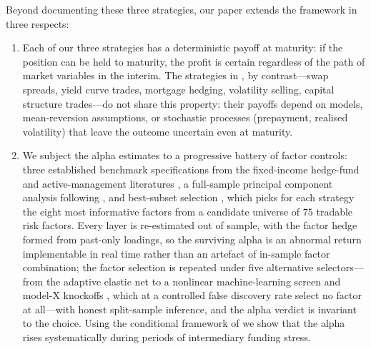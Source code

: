 Beyond documenting these three strategies, our paper extends the
\citet{duarte2007risk} framework in three
respects:
\begin{enumerate}[label=\textbf{\arabic*.}, leftmargin=*, itemsep=4pt]

\item Each of our three strategies has a deterministic payoff at
  maturity: if the position can be held to maturity, the profit is
  certain regardless of the path of market variables in the interim.
  The strategies in \citet{duarte2007risk}, by contrast---swap
  spreads, yield curve trades, mortgage hedging, volatility selling,
  capital structure trades---do not share this property: their
  payoffs depend on models, mean-reversion assumptions, or stochastic
  processes (prepayment, realised volatility) that leave the outcome
  uncertain even at maturity.

\item We subject the alpha estimates to a progressive battery of
  factor controls: three established benchmark
  specifications from the fixed-income hedge-fund and
  active-management literatures \citep{duarte2007risk,
  fung2004hedge, brooks2020active}, a full-sample principal component
  analysis following \citet{connor1986performance, connor1988risk},
  and best-subset selection \citep{bertsimas2016best}, which picks
  for each strategy the eight most informative factors from a
  candidate universe of $75$ tradable risk factors. Every layer is
  re-estimated out of sample, with the factor hedge formed from
  past-only loadings, so the surviving alpha is an abnormal return
  implementable in real time rather than an artefact of in-sample
  factor combination; the factor selection is repeated under five
  alternative selectors---from the adaptive elastic net
  \citep{zou2009adaptive} to a nonlinear machine-learning screen and
  model-X knockoffs \citep{candes2018panning}, which at a controlled
  false discovery rate select no factor at all---with honest
  split-sample inference, and the alpha verdict is invariant to the choice. Using the conditional framework of
  \citet{christopherson1998conditioning} we show that the alpha
  rises systematically during periods of intermediary funding
  stress.


\end{enumerate}
